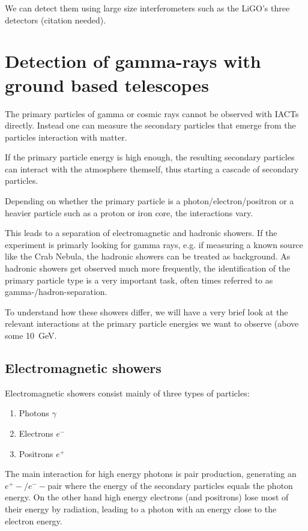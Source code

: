 We can detect them using large size interferometers such as
the LiGO's three detectors (citation needed).
\fi

\section{Detection of gamma-rays with ground based telescopes}
The primary particles of gamma or cosmic rays cannot be 
observed with IACTs directly. Instead one can measure the secondary particles
that emerge from the particles interaction with matter.

If the primary particle energy is high enough, the resulting 
secondary
particles can interact with the atmosphere themself, thus starting a 
cascade of secondary particles.

Depending on whether the primary particle is 
a photon/electron/positron or a heavier particle such as a proton 
or iron core, the interactions vary.

This leads to a separation of electromagnetic and hadronic showers.
If the experiment is primarly looking for 
gamma rays, e.g. if measuring a known source like the Crab Nebula, 
the hadronic showers can be treated as background.
As hadronic showers get observed much more frequently, 
the identification of the primary particle type is a very important 
task, often times referred to as gamma-/hadron-separation.

To understand how these showers differ, we will have a very brief look
at the relevant interactions at the primary particle energies
we want to observe (above some  \SI{10}{\giga\electronvolt}.

\subsection{Electromagnetic showers}
Electromagnetic showers consist mainly of three types of particles:
\begin{enumerate}
	\item{Photons $\gamma$}
	\item{Electrons $e^-$}
	\item{Positrons $e^+$}
\end{enumerate}

The main interaction for high energy photons is pair 
production, generating an $e^+-/e^--$pair where the energy of 
the secondary particles equals the photon energy.
On the other hand high energy electrons (and positrons) lose 
most of their energy by radiation, leading to a photon with 
an energy close to the electron energy.

